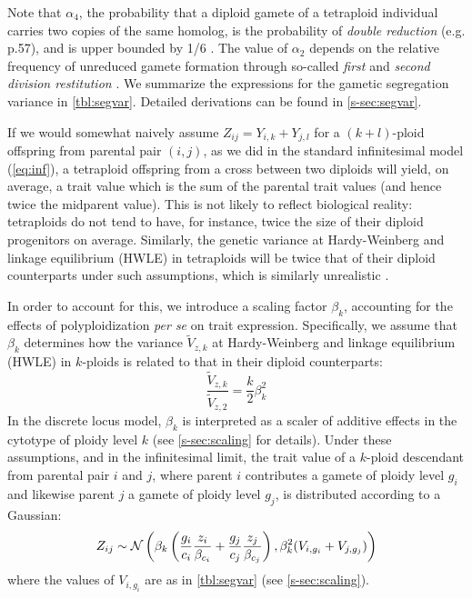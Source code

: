 \documentclass[11pt,a4paper]{article}
\begin{document}
Note that $\alpha_4$, the probability that a diploid gamete of a tetraploid
individual carries two copies of the same homolog, is the probability of
\textit{double reduction} (e.g. \cite{lynch1998} p.57), and is upper bounded by
1/6 \citep{stift2008}.
The value of $\alpha_2$ depends on the relative frequency of unreduced gamete
formation through so-called \textit{first} and \textit{second division
restitution} \citep{bretagnolle1995,storme2013}.
We summarize the expressions for the gametic segregation variance in
\cref{tbl:segvar}.
Detailed derivations can be found in \cref{s-sec:segvar}.

If we would somewhat naively assume $Z_{ij} = Y_{i,k} + Y_{j,l}$ for a
$(k+l)$-ploid offspring from parental pair $(i,j)$, as we did in the standard
infinitesimal model (\cref{eq:inf}), 
a tetraploid offspring from a cross between two diploids will yield, on average,
a trait value which is the sum of the parental trait values (and hence twice
the midparent value).
This is not likely to reflect biological reality: tetraploids do not tend to
have, for instance, twice the size of their diploid progenitors on average.
Similarly, the genetic variance at Hardy-Weinberg and linkage equilibrium
(HWLE) in tetraploids will be twice that of their diploid counterparts under
such assumptions, which is similarly unrealistic \citep{clo2022}.

In order to account for this, we introduce a scaling factor $\beta_k$,
accounting for the effects of polyploidization \textit{per se} on trait expression.
Specifically, we assume that $\beta_k$ determines how the variance
$\tilde{V}_{z,k}$ at Hardy-Weinberg and linkage equilibrium (HWLE) in
$k$-ploids is related to that in their diploid counterparts:
\begin{equation}
  \frac{\tilde{V}_{z,k}}{\tilde{V}_{z,2}} = \frac{k}{2} \beta_{k}^2
\end{equation}
In the discrete locus model, $\beta_k$ is interpreted as a scaler of additive
effects in the cytotype of ploidy level $k$ (see \cref{s-sec:scaling} for
details).
Under these assumptions, and in the infinitesimal limit, the trait value of a
$k$-ploid descendant from parental pair $i$ and $j$, where parent $i$
contributes a gamete of ploidy level $g_i$ and likewise parent $j$ a gamete of
ploidy level $g_j$, is distributed according to a Gaussian:
\begin{equation}
  Z_{ij} \sim \mathcal{N}\left(
    \beta_{k} \left(
          \frac{g_i}{c_i}\frac{z_i}{\beta_{c_i}} 
        + \frac{g_j}{c_j}\frac{z_j}{\beta_{c_j}}\right), 
    \beta_{k}^2 (V_{i,g_i} + V_{j,g_j})\right)
   \label{eq:oneline}
\end{equation}
where the values of $V_{i,g_{i}}$ are as in \cref{tbl:segvar} (see
\cref{s-sec:scaling}).
\end{document}
